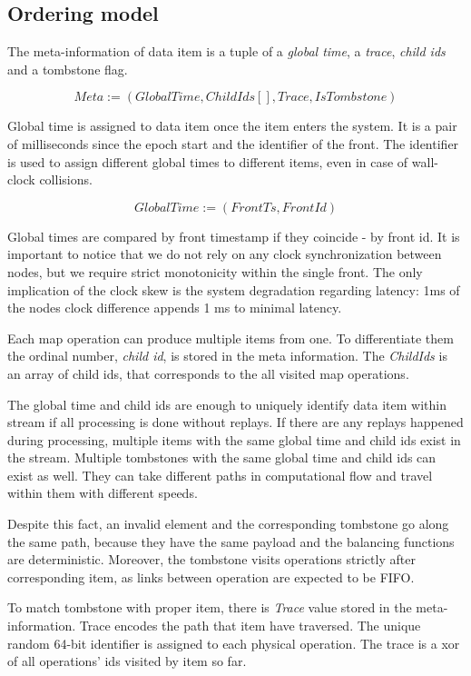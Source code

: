 \label{fs-impl}

\subsection{Ordering model}
The meta-information of data item is a tuple of a {\it global time}, a {\it trace}, {\it child ids} and a tombstone flag.

\[Meta := (GlobalTime, ChildIds[], Trace, IsTombstone)\]

Global time is assigned to data item once the item enters the system. It is a pair of milliseconds since the epoch start and the identifier of the front. The identifier is used to assign different global times to different items, even in case of wall-clock collisions. 

\[GlobalTime := (FrontTs, FrontId)\]

Global times are compared by front timestamp if they coincide - by front id. It is important to notice that we do not rely on any clock synchronization between nodes, but we require strict monotonicity within the single front. The only implication of the clock skew is the system degradation regarding latency: 1ms of the nodes clock difference appends 1 ms to minimal latency.

Each map operation can produce multiple items from one. To differentiate them the ordinal number, {\it child id}, is stored in the meta information. The {\it ChildIds } is an array of child ids, that corresponds to the all visited map operations.

The global time and child ids are enough to uniquely identify data item within stream if all processing is done without replays. If there are any replays happened during processing, multiple items with the same global time and child ids exist in the stream. Multiple tombstones with the same global time and child ids can exist as well. They can take different paths in computational flow and travel within them with different speeds. 

Despite this fact, an invalid element and the corresponding tombstone go along the same path, because they have the same payload and the balancing functions are deterministic. Moreover, the tombstone visits operations strictly after corresponding item, as links between operation are expected to be FIFO. 

To match tombstone with proper item, there is {\it Trace} value stored in the meta-information. Trace encodes the path that item have traversed. The unique random 64-bit identifier is assigned to each physical operation. The trace is a xor of all operations' ids visited by item so far.

